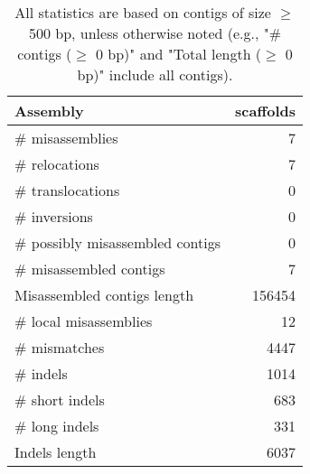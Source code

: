 \documentclass[12pt,a4paper]{article}
\begin{document}
\begin{table}[ht]
\begin{center}
\caption{All statistics are based on contigs of size $\geq$ 500 bp, unless otherwise noted (e.g., "\# contigs ($\geq$ 0 bp)" and "Total length ($\geq$ 0 bp)" include all contigs).}
\begin{tabular}{|l*{1}{|r}|}
\hline
Assembly & scaffolds \\ \hline
\# misassemblies & 7 \\ \hline
\hspace{5mm}\# relocations & 7 \\ \hline
\hspace{5mm}\# translocations & 0 \\ \hline
\hspace{5mm}\# inversions & 0 \\ \hline
\# possibly misassembled contigs & 0 \\ \hline
\# misassembled contigs & 7 \\ \hline
Misassembled contigs length & 156454 \\ \hline
\# local misassemblies & 12 \\ \hline
\# mismatches & 4447 \\ \hline
\# indels & 1014 \\ \hline
\hspace{5mm}\# short indels & 683 \\ \hline
\hspace{5mm}\# long indels & 331 \\ \hline
Indels length & 6037 \\ \hline
\end{tabular}
\end{center}
\end{table}
\end{document}

